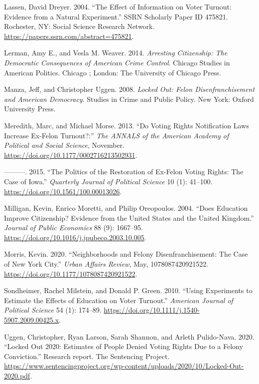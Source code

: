 \documentclass[
  12pt,
]{article}
\newlength{\cslhangindent}
\newenvironment{cslreferences}%
  {\setlength{\parindent}{0pt}%
  \everypar{\setlength{\hangindent}{\cslhangindent}}\ignorespaces}%
  {\par}
\begin{document}
\begin{cslreferences}
\leavevmode\hypertarget{ref-Lassen2004}{}%
Lassen, David Dreyer. 2004. ``The Effect of Information on Voter Turnout: Evidence from a Natural Experiment.'' SSRN Scholarly Paper ID 475821. Rochester, NY: Social Science Research Network. \url{https://papers.ssrn.com/abstract=475821}.

\leavevmode\hypertarget{ref-Lerman2014}{}%
Lerman, Amy E., and Vesla M. Weaver. 2014. \emph{Arresting Citizenship: The Democratic Consequences of American Crime Control}. Chicago Studies in American Politics. Chicago ; London: The University of Chicago Press.

\leavevmode\hypertarget{ref-locked_out}{}%
Manza, Jeff, and Christopher Uggen. 2008. \emph{Locked Out: Felon Disenfranchisement and American Democracy}. Studies in Crime and Public Policy. New York: Oxford University Press.

\leavevmode\hypertarget{ref-Meredith2013}{}%
Meredith, Marc, and Michael Morse. 2013. ``Do Voting Rights Notification Laws Increase Ex-Felon Turnout?:'' \emph{The ANNALS of the American Academy of Political and Social Science}, November. \url{https://doi.org/10.1177/0002716213502931}.

\leavevmode\hypertarget{ref-Meredith2015}{}%
---------. 2015. ``The Politics of the Restoration of Ex-Felon Voting Rights: The Case of Iowa.'' \emph{Quarterly Journal of Political Science} 10 (1): 41--100. \url{https://doi.org/10.1561/100.00013026}.

\leavevmode\hypertarget{ref-Milligan2004}{}%
Milligan, Kevin, Enrico Moretti, and Philip Oreopoulos. 2004. ``Does Education Improve Citizenship? Evidence from the United States and the United Kingdom.'' \emph{Journal of Public Economics} 88 (9): 1667--95. \url{https://doi.org/10.1016/j.jpubeco.2003.10.005}.

\leavevmode\hypertarget{ref-Morris2020}{}%
Morris, Kevin. 2020. ``Neighborhoods and Felony Disenfranchisement: The Case of New York City.'' \emph{Urban Affairs Review}, May, 1078087420921522. \url{https://doi.org/10.1177/1078087420921522}.

\leavevmode\hypertarget{ref-Sondheimer2010}{}%
Sondheimer, Rachel Milstein, and Donald P. Green. 2010. ``Using Experiments to Estimate the Effects of Education on Voter Turnout.'' \emph{American Journal of Political Science} 54 (1): 174--89. \url{https://doi.org/10.1111/j.1540-5907.2009.00425.x}.

\leavevmode\hypertarget{ref-Uggen2020}{}%
Uggen, Christopher, Ryan Larson, Sarah Shannon, and Arleth Pulido-Nava. 2020. ``Locked Out 2020: Estimates of People Denied Voting Rights Due to a Felony Conviction.'' Research report. The Sentencing Project. \url{https://www.sentencingproject.org/wp-content/uploads/2020/10/Locked-Out-2020.pdf}.


\end{cslreferences}
\end{document}

